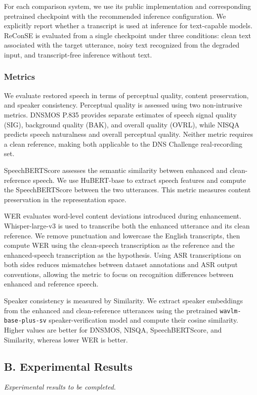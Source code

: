 \documentclass{article}
\begin{document}
For each comparison system, we use its public implementation and corresponding pretrained checkpoint with the recommended inference configuration. We explicitly report whether a transcript is used at inference for text-capable models. ReConSE is evaluated from a single checkpoint under three conditions: clean text associated with the target utterance, noisy text recognized from the degraded input, and transcript-free inference without text.

\subsubsection{Metrics}

We evaluate restored speech in terms of perceptual quality, content preservation, and speaker consistency. Perceptual quality is assessed using two non-intrusive metrics. DNSMOS P.835 provides separate estimates of speech signal quality (SIG), background quality (BAK), and overall quality (OVRL), while NISQA predicts speech naturalness and overall perceptual quality. Neither metric requires a clean reference, making both applicable to the DNS Challenge real-recording set.

SpeechBERTScore assesses the semantic similarity between enhanced and clean-reference speech. We use HuBERT-base to extract speech features and compute the SpeechBERTScore between the two utterances. This metric measures content preservation in the representation space.

WER evaluates word-level content deviations introduced during enhancement. Whisper-large-v3 is used to transcribe both the enhanced utterance and its clean reference. We remove punctuation and lowercase the English transcripts, then compute WER using the clean-speech transcription as the reference and the enhanced-speech transcription as the hypothesis. Using ASR transcriptions on both sides reduces mismatches between dataset annotations and ASR output conventions, allowing the metric to focus on recognition differences between enhanced and reference speech.

Speaker consistency is measured by Similarity. We extract speaker embeddings from the enhanced and clean-reference utterances using the pretrained \texttt{wavlm-base-plus-sv} speaker-verification model and compute their cosine similarity. Higher values are better for DNSMOS, NISQA, SpeechBERTScore, and Similarity, whereas lower WER is better.

\subsection{B. Experimental Results}
\textit{Experimental results to be completed.}
\end{document}
